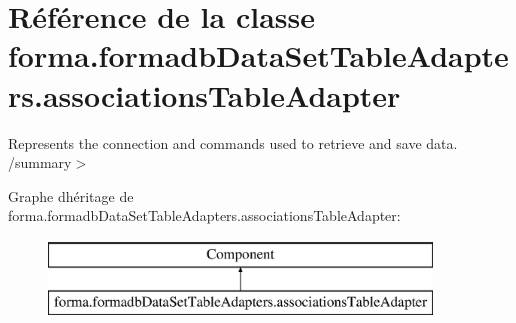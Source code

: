 \hypertarget{classforma_1_1formadb_data_set_table_adapters_1_1associations_table_adapter}{}\section{Référence de la classe forma.\+formadb\+Data\+Set\+Table\+Adapters.\+associations\+Table\+Adapter}
\label{classforma_1_1formadb_data_set_table_adapters_1_1associations_table_adapter}


Represents the connection and commands used to retrieve and save data. /summary$>$  


Graphe d\textquotesingle{}héritage de forma.\+formadb\+Data\+Set\+Table\+Adapters.\+associations\+Table\+Adapter\+:\begin{figure}[H]
\begin{center}
\leavevmode
\includegraphics[height=2.000000cm]{classforma_1_1formadb_data_set_table_adapters_1_1associations_table_adapter}
\end{center}
\end{figure}
